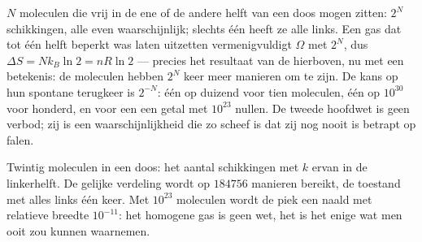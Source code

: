 \begin{example}\label{ex:b1:second-law-entropy:count}
$N$ moleculen die vrij in de ene of de andere helft van een doos mogen zitten: $2^N$ schikkingen,
alle even waarschijnlijk; slechts één heeft ze alle links. Een gas dat tot
één helft beperkt was laten uitzetten vermenigvuldigt $\Omega$ met $2^N$, dus $\Delta S =
Nk_B\ln2 = nR\ln2$ --- precies het resultaat van de  hierboven, nu met
een betekenis: de moleculen hebben $2^N$ keer meer manieren om te zijn. De kans op
hun spontane terugkeer is $2^{-N}$: één op duizend voor tien
moleculen, één op $10^{30}$ voor honderd, en voor een  een getal met
$10^{23}$ nullen. De tweede hoofdwet is geen verbod; zij is een waarschijnlijkheid
die zo scheef is dat zij nog nooit is betrapt op falen.
\end{example}

\begin{omfigure}

{\small Twintig moleculen in een doos: het aantal schikkingen met $k$
ervan in de linkerhelft. De gelijke verdeling wordt op $184756$ manieren bereikt, de
toestand met alles links één keer. Met $10^{23}$ moleculen wordt de piek een naald
met relatieve breedte $10^{-11}$: het homogene gas is geen wet, het is het
enige wat men ooit zou kunnen waarnemen.}
\end{omfigure}

